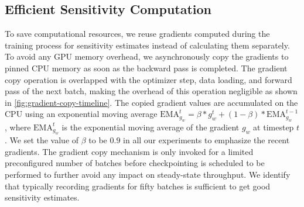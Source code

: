\subsection{Efficient Sensitivity Computation} 
\label{app:sensitivity-computation}
To save computational resources, we reuse gradients computed during the training process for sensitivity estimates instead of calculating them separately. To avoid any GPU memory overhead, we asynchronously copy the gradients to pinned CPU memory as soon as the backward pass is completed. The gradient copy operation is overlapped with the optimizer step, data loading, and forward pass of the next batch, making the overhead of this operation negligible as shown in \cref{fig:gradient-copy-timeline}. The copied gradient values are accumulated on the CPU using an exponential moving average $\text{EMA}^{t}_{g_w} = \beta * g^{t}_w + (1 - \beta) * \text{EMA}^{t - 1}_{g_w}$, where $\text{EMA}^{t}_{g_w}$ is the exponential moving average of the gradient $g_w$ at timestep $t$. We set the value of $\beta$ to be $0.9$ in all our experiments to emphasize the recent gradients. The gradient copy mechanism is only invoked for a limited preconfigured number of batches before checkpointing is scheduled to be performed to further avoid any impact on steady-state throughput. We identify that typically recording gradients for fifty batches is sufficient to get good sensitivity estimates. 






















